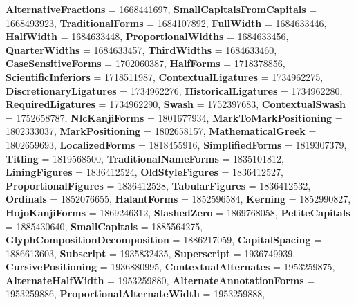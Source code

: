 \begin{DoxyCompactItemize}
{\bfseries Alternative\+Fractions} = 1668441697, 
\newline
{\bfseries Small\+Capitals\+From\+Capitals} = 1668493923, 
{\bfseries Traditional\+Forms} = 1684107892, 
{\bfseries Full\+Width} = 1684633446, 
{\bfseries Half\+Width} = 1684633448, 
\newline
{\bfseries Proportional\+Widths} = 1684633456, 
{\bfseries Quarter\+Widths} = 1684633457, 
{\bfseries Third\+Widths} = 1684633460, 
{\bfseries Case\+Sensitive\+Forms} = 1702060387, 
\newline
{\bfseries Half\+Forms} = 1718378856, 
{\bfseries Scientific\+Inferiors} = 1718511987, 
{\bfseries Contextual\+Ligatures} = 1734962275, 
{\bfseries Discretionary\+Ligatures} = 1734962276, 
\newline
{\bfseries Historical\+Ligatures} = 1734962280, 
{\bfseries Required\+Ligatures} = 1734962290, 
{\bfseries Swash} = 1752397683, 
{\bfseries Contextual\+Swash} = 1752658787, 
\newline
{\bfseries Nlc\+Kanji\+Forms} = 1801677934, 
{\bfseries Mark\+To\+Mark\+Positioning} = 1802333037, 
{\bfseries Mark\+Positioning} = 1802658157, 
{\bfseries Mathematical\+Greek} = 1802659693, 
\newline
{\bfseries Localized\+Forms} = 1818455916, 
{\bfseries Simplified\+Forms} = 1819307379, 
{\bfseries Titling} = 1819568500, 
{\bfseries Traditional\+Name\+Forms} = 1835101812, 
\newline
{\bfseries Lining\+Figures} = 1836412524, 
{\bfseries Old\+Style\+Figures} = 1836412527, 
{\bfseries Proportional\+Figures} = 1836412528, 
{\bfseries Tabular\+Figures} = 1836412532, 
\newline
{\bfseries Ordinals} = 1852076655, 
{\bfseries Halant\+Forms} = 1852596584, 
{\bfseries Kerning} = 1852990827, 
{\bfseries Hojo\+Kanji\+Forms} = 1869246312, 
\newline
{\bfseries Slashed\+Zero} = 1869768058, 
{\bfseries Petite\+Capitals} = 1885430640, 
{\bfseries Small\+Capitals} = 1885564275, 
{\bfseries Glyph\+Composition\+Decomposition} = 1886217059, 
\newline
{\bfseries Capital\+Spacing} = 1886613603, 
{\bfseries Subscript} = 1935832435, 
{\bfseries Superscript} = 1936749939, 
{\bfseries Cursive\+Positioning} = 1936880995, 
\newline
{\bfseries Contextual\+Alternates} = 1953259875, 
{\bfseries Alternate\+Half\+Width} = 1953259880, 
{\bfseries Alternate\+Annotation\+Forms} = 1953259886, 
{\bfseries Proportional\+Alternate\+Width} = 1953259888, 
\newline

\end{DoxyCompactItemize}
